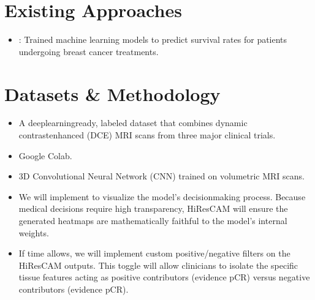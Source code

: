 \documentclass[letterpaper,10pt,english]{sphinxmanual}
\begin{document}
\section{Existing Approaches}
\label{\detokenize{index:existing-approaches}}\begin{itemize}
\item {} 
\sphinxAtStartPar
{}: Trained machine learning models to predict survival rates for patients undergoing breast cancer treatments. 

\end{itemize}


\section{Datasets \& Methodology}
\label{\detokenize{index:datasets-methodology}}\begin{itemize}
\item {} 
\sphinxAtStartPar
{}  A deep\sphinxhyphen{}learning\sphinxhyphen{}ready, labeled dataset that combines dynamic contrast\sphinxhyphen{}enhanced (DCE) MRI scans from three major clinical trials.

\item {} 
\sphinxAtStartPar
{} Google Colab.

\item {} 
\sphinxAtStartPar
{} 3D Convolutional Neural Network (CNN) trained on volumetric MRI scans.

\item {} 
\sphinxAtStartPar
{} We will implement  to visualize the model’s decision\sphinxhyphen{}making process. Because medical decisions require high transparency, HiResCAM will ensure the generated heatmaps are mathematically faithful to the model’s internal weights.

\item {} 
\sphinxAtStartPar
{} If time allows, we will implement custom positive/negative filters on the HiResCAM outputs. This toggle will allow clinicians to isolate the specific tissue features acting as positive contributors (evidence  pCR) versus negative contributors (evidence  pCR).

\end{itemize}
\end{document}
